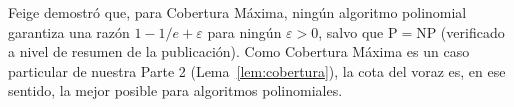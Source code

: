 \begin{observacion}
Feige \cite{feige1998} demostró que, para Cobertura Máxima, ningún algoritmo polinomial garantiza una razón $1-1/e+\varepsilon$ para ningún $\varepsilon>0$, salvo que P$=$NP (verificado a nivel de resumen de la publicación). Como Cobertura Máxima es un caso particular de nuestra Parte 2 (Lema~\ref{lem:cobertura}), la cota del voraz es, en ese sentido, la mejor posible para algoritmos polinomiales.
\end{observacion}
